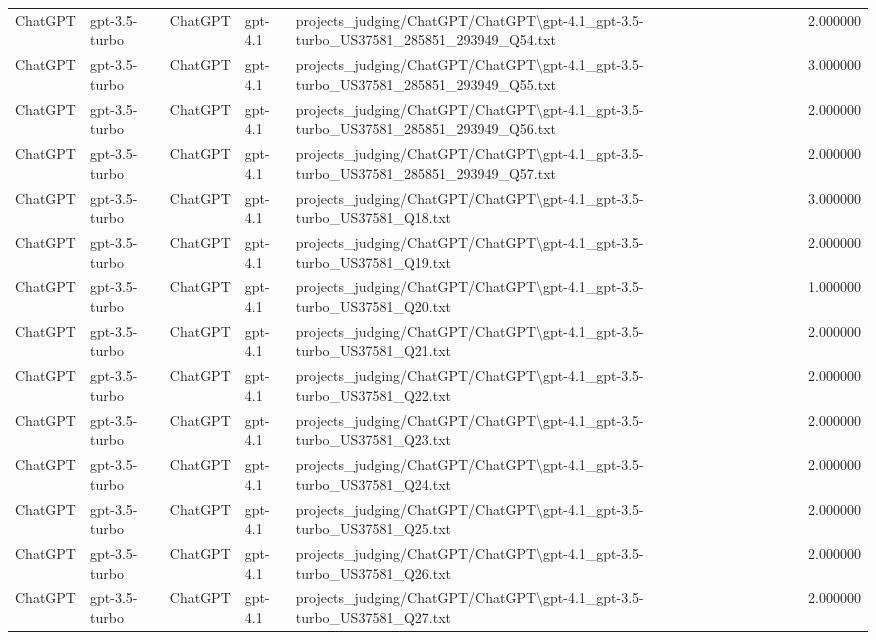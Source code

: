\begin{table}[H]
\begin{tabular}{lllllr}
ChatGPT & gpt-3.5-turbo & ChatGPT & gpt-4.1 & projects\_judging/ChatGPT/ChatGPT\textbackslash gpt-4.1\_gpt-3.5-turbo\_US37581\_285851\_293949\_Q54.txt & 2.000000 \\
ChatGPT & gpt-3.5-turbo & ChatGPT & gpt-4.1 & projects\_judging/ChatGPT/ChatGPT\textbackslash gpt-4.1\_gpt-3.5-turbo\_US37581\_285851\_293949\_Q55.txt & 3.000000 \\
ChatGPT & gpt-3.5-turbo & ChatGPT & gpt-4.1 & projects\_judging/ChatGPT/ChatGPT\textbackslash gpt-4.1\_gpt-3.5-turbo\_US37581\_285851\_293949\_Q56.txt & 2.000000 \\
ChatGPT & gpt-3.5-turbo & ChatGPT & gpt-4.1 & projects\_judging/ChatGPT/ChatGPT\textbackslash gpt-4.1\_gpt-3.5-turbo\_US37581\_285851\_293949\_Q57.txt & 2.000000 \\
ChatGPT & gpt-3.5-turbo & ChatGPT & gpt-4.1 & projects\_judging/ChatGPT/ChatGPT\textbackslash gpt-4.1\_gpt-3.5-turbo\_US37581\_Q18.txt & 3.000000 \\
ChatGPT & gpt-3.5-turbo & ChatGPT & gpt-4.1 & projects\_judging/ChatGPT/ChatGPT\textbackslash gpt-4.1\_gpt-3.5-turbo\_US37581\_Q19.txt & 2.000000 \\
ChatGPT & gpt-3.5-turbo & ChatGPT & gpt-4.1 & projects\_judging/ChatGPT/ChatGPT\textbackslash gpt-4.1\_gpt-3.5-turbo\_US37581\_Q20.txt & 1.000000 \\
ChatGPT & gpt-3.5-turbo & ChatGPT & gpt-4.1 & projects\_judging/ChatGPT/ChatGPT\textbackslash gpt-4.1\_gpt-3.5-turbo\_US37581\_Q21.txt & 2.000000 \\
ChatGPT & gpt-3.5-turbo & ChatGPT & gpt-4.1 & projects\_judging/ChatGPT/ChatGPT\textbackslash gpt-4.1\_gpt-3.5-turbo\_US37581\_Q22.txt & 2.000000 \\
ChatGPT & gpt-3.5-turbo & ChatGPT & gpt-4.1 & projects\_judging/ChatGPT/ChatGPT\textbackslash gpt-4.1\_gpt-3.5-turbo\_US37581\_Q23.txt & 2.000000 \\
ChatGPT & gpt-3.5-turbo & ChatGPT & gpt-4.1 & projects\_judging/ChatGPT/ChatGPT\textbackslash gpt-4.1\_gpt-3.5-turbo\_US37581\_Q24.txt & 2.000000 \\
ChatGPT & gpt-3.5-turbo & ChatGPT & gpt-4.1 & projects\_judging/ChatGPT/ChatGPT\textbackslash gpt-4.1\_gpt-3.5-turbo\_US37581\_Q25.txt & 2.000000 \\
ChatGPT & gpt-3.5-turbo & ChatGPT & gpt-4.1 & projects\_judging/ChatGPT/ChatGPT\textbackslash gpt-4.1\_gpt-3.5-turbo\_US37581\_Q26.txt & 2.000000 \\
ChatGPT & gpt-3.5-turbo & ChatGPT & gpt-4.1 & projects\_judging/ChatGPT/ChatGPT\textbackslash gpt-4.1\_gpt-3.5-turbo\_US37581\_Q27.txt & 2.000000 \\

\end{tabular}
\end{table}
